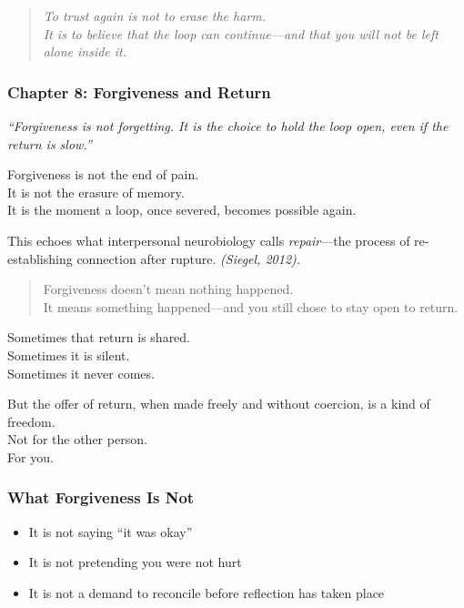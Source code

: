 \begin{quote}
\emph{To trust again is not to erase the harm.\\
It is to believe that the loop can continue---and that you will not be
left alone inside it.}
\end{quote}

\subsubsection{\texorpdfstring{ \textbf{Chapter 8: Forgiveness and
Return}}{ Chapter 8: Forgiveness and Return}}\label{chapter-8-forgiveness-and-return}

\emph{``Forgiveness is not forgetting. It is the choice to hold the loop
open, even if the return is slow.''}

Forgiveness is not the end of pain.\\
It is not the erasure of memory.\\
It is the moment a loop, once severed, becomes possible again.

This echoes what interpersonal neurobiology calls \emph{repair}---the
process of re-establishing connection after rupture. \emph{(Siegel,
2012).}

\begin{quote}
Forgiveness doesn't mean nothing happened.\\
It means something happened---and you still chose to stay open to
return.
\end{quote}

Sometimes that return is shared.\\
Sometimes it is silent.\\
Sometimes it never comes.

But the offer of return, when made freely and without coercion, is a
kind of freedom.\\
Not for the other person.\\
For you.

\subsubsection{\texorpdfstring{\textbf{What Forgiveness Is
Not}}{What Forgiveness Is Not}}\label{what-forgiveness-is-not}

\begin{itemize}
\item
  It is not saying ``it was okay''
\item
  It is not pretending you were not hurt
\item
  It is not a demand to reconcile before reflection has taken place
\end{itemize}

